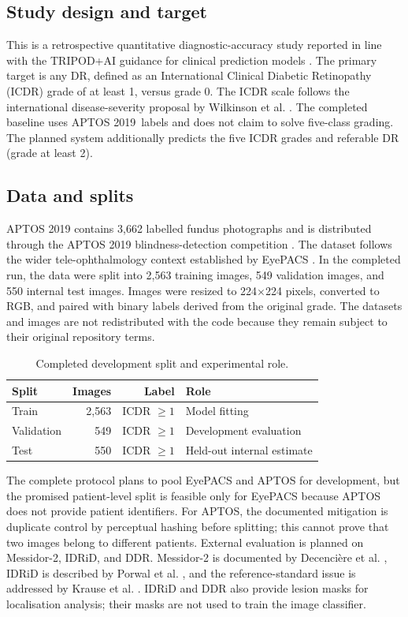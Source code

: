 \documentclass[11pt,a4paper]{article}
\newcommand{\aptos}{APTOS 2019}
\begin{document}
\subsection{Study design and target}
This is a retrospective quantitative diagnostic-accuracy study reported in line with the TRIPOD+AI guidance for clinical prediction models \cite{tripodai2024}. The primary target is any DR, defined as an International Clinical Diabetic Retinopathy (ICDR) grade of at least 1, versus grade 0. The ICDR scale follows the international disease-severity proposal by Wilkinson et al. \cite{wilkinson2003}. The completed baseline uses \aptos\ labels and does not claim to solve five-class grading. The planned system additionally predicts the five ICDR grades and referable DR (grade at least 2).

\subsection{Data and splits}
APTOS 2019 contains 3,662 labelled fundus photographs and is distributed through the APTOS 2019 blindness-detection competition \cite{aptos2019}. The dataset follows the wider tele-ophthalmology context established by EyePACS \cite{cuadros2009}. In the completed run, the data were split into 2,563 training images, 549 validation images, and 550 internal test images. Images were resized to 224$\times$224 pixels, converted to RGB, and paired with binary labels derived from the original grade. The datasets and images are not redistributed with the code because they remain subject to their original repository terms.

\begin{table}[H]\centering\small
\caption{Completed development split and experimental role.}\label{tab:data}
\begin{tabularx}{0.85\linewidth}{lrrX}\toprule
Split & Images & Label & Role\\\midrule
Train & 2,563 & ICDR $\geq 1$ & Model fitting\\
Validation & 549 & ICDR $\geq 1$ & Development evaluation\\
Test & 550 & ICDR $\geq 1$ & Held-out internal estimate\\\bottomrule
\end{tabularx}\end{table}

The complete protocol plans to pool EyePACS and APTOS for development, but the promised patient-level split is feasible only for EyePACS because APTOS does not provide patient identifiers. For APTOS, the documented mitigation is duplicate control by perceptual hashing before splitting; this cannot prove that two images belong to different patients. External evaluation is planned on Messidor-2, IDRiD, and DDR. Messidor-2 is documented by Decencière et al. \cite{decenciere2014}, IDRiD is described by Porwal et al. \cite{porwal2018}, and the reference-standard issue is addressed by Krause et al. \cite{krause2018}. IDRiD and DDR also provide lesion masks for localisation analysis; their masks are not used to train the image classifier.
\end{document}

